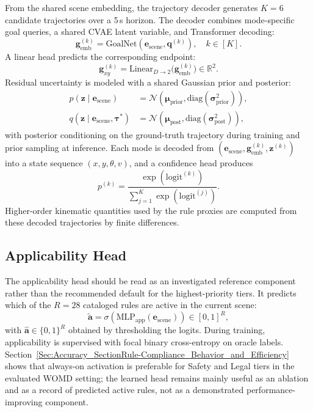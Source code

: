 From the shared scene embedding, the trajectory decoder generates $K{=}6$ candidate trajectories over a 5\,s horizon. The decoder combines mode-specific goal queries, a shared CVAE latent variable, and Transformer decoding:
\begin{equation}
\mathbf{g}_{\text{emb}}^{(k)} = \text{GoalNet}(\mathbf{e}_{\text{scene}}, \mathbf{q}^{(k)}), \quad k\in[K].
\end{equation}
\noindent A linear head predicts the corresponding endpoint:
\begin{equation}
\mathbf{g}_{xy}^{(k)} = \text{Linear}_{D\to 2}\big(\mathbf{g}_{\text{emb}}^{(k)}\big)\in\mathbb{R}^{2}.
\end{equation}
\noindent Residual uncertainty is modeled with a shared Gaussian prior and posterior:
\begin{align}
p(\mathbf{z}\mid \mathbf{e}_{\text{scene}}) &=
\mathcal{N}(\boldsymbol{\mu}_{\text{prior}}, \text{diag}(\boldsymbol{\sigma}^2_{\text{prior}})), \\
q(\mathbf{z}\mid \mathbf{e}_{\text{scene}},\boldsymbol{\tau}^{*}) &=
\mathcal{N}(\boldsymbol{\mu}_{\text{post}}, \text{diag}(\boldsymbol{\sigma}^2_{\text{post}})),
\end{align}
with posterior conditioning on the ground-truth trajectory during training and prior sampling at inference. Each mode is decoded from $(\mathbf{e}_{\text{scene}},\mathbf{g}_{\text{emb}}^{(k)},\mathbf{z}^{(k)})$ into a state sequence $(x,y,\theta,v)$, and a confidence head produces
\begin{equation}
p^{(k)}=\frac{\exp(\text{logit}^{(k)})}{\sum_{j=1}^{K}\exp(\text{logit}^{(j)})}.
\end{equation}
Higher-order kinematic quantities used by the rule proxies are computed from these decoded trajectories by finite differences.

\subsection{Applicability Head}
\label{subsec:applicability_head}

The applicability head should be read as an investigated reference component rather than the recommended default for the highest-priority tiers. It predicts which of the $R{=}28$ cataloged rules are active in the current scene:
\begin{equation}
\label{eq:app_head_shorthand}
\tilde{\mathbf{a}}=\sigma\!\left(\text{MLP}_{\text{app}}(\mathbf{e}_{\text{scene}})\right)\in[0,1]^R,
\end{equation}
with $\hat{\mathbf{a}}\in\{0,1\}^R$ obtained by thresholding the logits. During training, applicability is supervised with focal binary cross-entropy on oracle labels. Section~\ref{Sec:Accuracy_SectionRule-Compliance_Behavior_and_Efficiency} shows that always-on activation is preferable for Safety and Legal tiers in the evaluated WOMD setting; the learned head remains mainly useful as an ablation and as a record of predicted active rules, not as a demonstrated performance-improving component.

